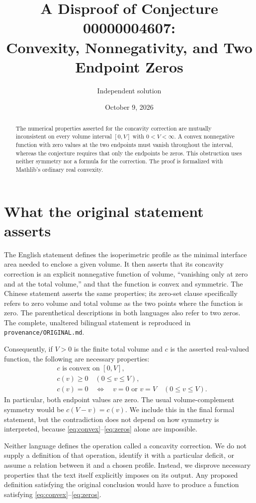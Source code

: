 \documentclass[11pt]{article}
\title{A Disproof of Conjecture 00000004607:\\
Convexity, Nonnegativity, and Two Endpoint Zeros}
\author{Independent solution}
\date{October 9, 2026}
\begin{document}
\maketitle

\begin{abstract}
The numerical properties asserted for the concavity correction are mutually
inconsistent on every volume interval $[0,V]$ with $0<V<\infty$. A convex
nonnegative function with zero values at the two endpoints must vanish
throughout the interval, whereas the conjecture requires that only the endpoints
be zeros. This obstruction uses neither symmetry nor a formula for the
correction. The proof is formalized with Mathlib's ordinary real convexity.
\end{abstract}

\section{What the original statement asserts}
The English statement defines the isoperimetric profile as the minimal interface
area needed to enclose a given volume. It then asserts that its concavity
correction is an explicit nonnegative function of volume, ``vanishing only at
zero and at the total volume,'' and that the function is convex and symmetric.
The Chinese statement asserts the same properties; its zero-set clause
specifically refers to zero volume and total volume as the two points where
the function is zero. The parenthetical descriptions in both languages also
refer to two zeros. The complete, unaltered bilingual statement is reproduced
in \texttt{provenance/ORIGINAL.md}.

Consequently, if $V>0$ is the finite total volume and $c$ is the asserted
real-valued function, the following are necessary properties:
\begin{align}
&c\text{ is convex on }[0,V], \label{eq:convex}\\
&c(v)\geq 0\quad(0\leq v\leq V), \label{eq:positive}\\
&c(v)=0\quad\Longleftrightarrow\quad v=0\text{ or }v=V
  \quad(0\leq v\leq V). \label{eq:zeros}
\end{align}
In particular, both endpoint values are zero. The usual volume-complement
symmetry would be $c(V-v)=c(v)$. We include this in the final formal statement,
but the contradiction does not depend on how symmetry is interpreted, because
\eqref{eq:convex}--\eqref{eq:zeros} alone are impossible.

Neither language defines the operation called a concavity correction. We do
not supply a definition of that operation, identify it with a particular
deficit, or assume a relation between it and a chosen profile. Instead, we
disprove necessary properties that the text itself explicitly imposes on its
output. Any proposed definition satisfying the original conclusion would have
to produce a function satisfying \eqref{eq:convex}--\eqref{eq:zeros}.
\end{document}
